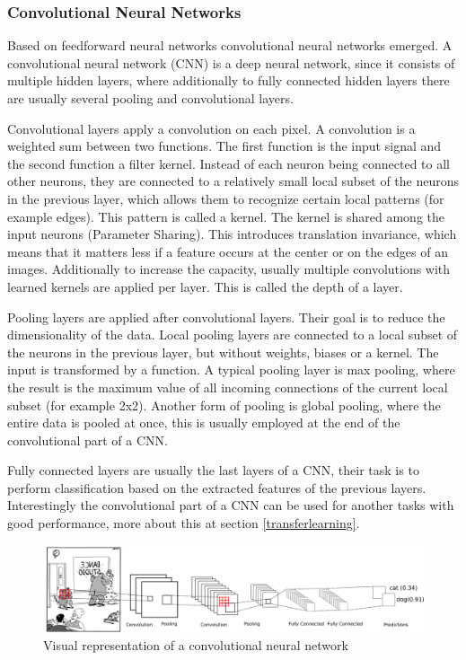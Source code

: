 \documentclass[draft,final,oneside]{vutinfth} %
\begin{document}
\subsubsection{Convolutional Neural Networks} \label{mlcnn}

Based on feedforward neural networks convolutional neural networks emerged. A convolutional neural network (CNN) is a deep neural network, since it consists of multiple hidden layers, where additionally to fully connected hidden layers there are usually several pooling and convolutional layers.

Convolutional layers apply a convolution on each pixel. A convolution is a weighted sum between two functions. The first function is the input signal and the second function a filter kernel. Instead of each neuron being connected to all other neurons, they are connected to a relatively small local subset of the neurons in the previous layer, which allows them to recognize certain local patterns (for example edges). This pattern is called a kernel. The kernel is shared among the input neurons (Parameter Sharing). This introduces translation invariance, which means that it matters less if a feature occurs at the center or on the edges of an images. Additionally to increase the capacity, usually multiple convolutions with learned kernels are applied per layer. This is called the depth of a layer.

Pooling layers are applied after convolutional layers. Their goal is to reduce the dimensionality of the data. Local pooling layers are connected to a local subset of the neurons in the previous layer, but without weights, biases or a kernel. The input is transformed by a function. A typical pooling layer is max pooling, where the result is the maximum value of all incoming connections of the current local subset (for example 2x2). Another form of pooling is global pooling, where the entire data is pooled at once, this is usually employed at the end of the convolutional part of a CNN.

Fully connected layers are usually the last layers of a CNN, their task is to perform classification based on the extracted features of the previous layers. Interestingly the convolutional part of a CNN can be used for another tasks with good performance, more about this at section \ref{transferlearning}.

\begin{figure}[ht]
	\centering
  	\includegraphics[width=1.0\textwidth]{graphics/cnn.png}
	\caption{Visual representation of a convolutional neural network}
	\label{fig:feedforward}
\end{figure}
\pagebreak
\end{document}

